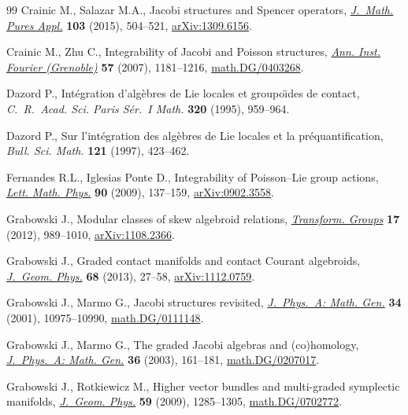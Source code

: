 \begin{thebibliography}{99}
Crainic M., Salazar M.A., Jacobi structures and {S}pencer operators,
 \href{https://doi.org/10.1016/j.matpur.2014.04.012}{\textit{J.~Math. Pures Appl.}} \textbf{103} (2015), 504--521,
 \href{https://arxiv.org/abs/1309.6156}{arXiv:1309.6156}.

Crainic M., Zhu C., Integrability of {J}acobi and {P}oisson structures,
 \href{https://doi.org/10.5802/aif.2291}{\textit{Ann. Inst. Fourier (Grenoble)}} \textbf{57} (2007), 1181--1216,
 \href{https://arxiv.org/abs/math.DG/0403268}{math.DG/0403268}.

Dazord P., Int\'egration d'alg\`ebres de {L}ie locales et groupo\"\i des de
 contact, \textit{C.~R.~Acad. Sci. Paris S\'er.~I Math.} \textbf{320} (1995),
 959--964.

Dazord P., Sur l'int\'egration des alg\`ebres de {L}ie locales et la
 pr\'equantif\/ication, \textit{Bull. Sci. Math.} \textbf{121} (1997), 423--462.

Fernandes R.L., Iglesias Ponte D., Integrability of {P}oisson--{L}ie group
 actions, \href{https://doi.org/10.1007/s11005-009-0348-x}{\textit{Lett. Math. Phys.}} \textbf{90} (2009), 137--159,
 \href{https://arxiv.org/abs/0902.3558}{arXiv:0902.3558}.

Grabowski J., Modular classes of skew algebroid relations, \href{https://doi.org/10.1007/s00031-012-9197-2}{\textit{Transform.
 Groups}} \textbf{17} (2012), 989--1010, \href{https://arxiv.org/abs/1108.2366}{arXiv:1108.2366}.

Grabowski J., Graded contact manifolds and contact {C}ourant algebroids,
 \href{https://doi.org/10.1016/j.geomphys.2013.02.001}{\textit{J.~Geom. Phys.}} \textbf{68} (2013), 27--58, \href{https://arxiv.org/abs/1112.0759}{arXiv:1112.0759}.

Grabowski J., Marmo G., Jacobi structures revisited, \href{https://doi.org/10.1088/0305-4470/34/49/316}{\textit{J.~Phys.~A: Math.
 Gen.}} \textbf{34} (2001), 10975--10990, \href{https://arxiv.org/abs/math.DG/0111148}{math.DG/0111148}.

Grabowski J., Marmo G., The graded {J}acobi algebras and (co)homology,
 \href{http://doi.org/10.1088/0305-4470/36/1/311}{\textit{J.~Phys.~A: Math. Gen.}} \textbf{36} (2003), 161--181,
 \href{https://arxiv.org/abs/math.DG/0207017}{math.DG/0207017}.

Grabowski J., Rotkiewicz M., Higher vector bundles and multi-graded symplectic
 manifolds, \href{https://doi.org/10.1016/j.geomphys.2009.06.009}{\textit{J.~Geom. Phys.}} \textbf{59} (2009), 1285--1305,
 \href{https://arxiv.org/abs/math.DG/0702772}{math.DG/0702772}.


\end{thebibliography}
